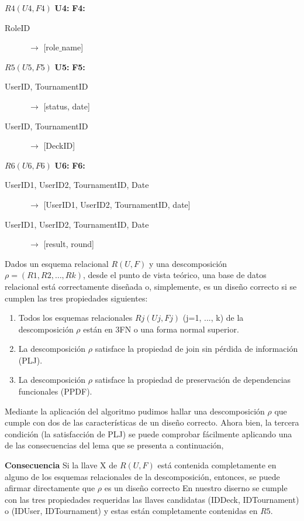 \documentclass[a4paper]{article}
\begin{document}
$R4(U4,F4)$
\textbf{U4:}
\textbf{F4:}
\begin{description}
  \item[RoleID] $\rightarrow$ [role$\_$name]
\end{description}

$R5(U5,F5)$
\textbf{U5:}
\textbf{F5:}
\begin{description}
  \item[UserID, TournamentID] $\rightarrow$ [status, date]
  \item[UserID, TournamentID] $\rightarrow$ [DeckID]
\end{description}

$R6(U6,F6)$
\textbf{U6:}
\textbf{F6:}
\begin{description}
  \item[UserID1, UserID2, TournamentID, Date] $\rightarrow$ [UserID1, UserID2, TournamentID, date]
  \item[UserID1, UserID2, TournamentID, Date] $\rightarrow$ [result, round]
\end{description}

Dados un esquema relacional $R (U, F)$ y una descomposición $\rho = (R1, R2, \ldots, Rk)$, desde el punto de vista teórico, una base de datos relacional está correctamente diseñada o, simplemente, es un diseño correcto si se cumplen las tres propiedades siguientes: 
\begin{enumerate}
  \item Todos los esquemas relacionales $Rj (Uj, Fj)$ (j=1, ..., k) de la descomposición $\rho$ están en 3FN o una forma normal superior. 
  \item La descomposición $\rho$ satisface la propiedad de join sin pérdida de información (PLJ). 
  \item La descomposición $\rho$ satisface la propiedad de preservación de dependencias funcionales (PPDF).
\end{enumerate}

Mediante la aplicación del algoritmo pudimos hallar una descomposición $\rho$ que cumple con dos de las características de un diseño correcto. Ahora bien, la tercera condición (la satisfacción de PLJ) se puede comprobar fácilmente aplicando una de las consecuencias del lema que se presenta a continuación,

\textbf{Consecuencia} Si la llave X de $R (U, F)$ está contenida completamente en alguno de los esquemas relacionales de la descomposición, entonces, se puede afirmar directamente que $\rho$ es un diseño correcto 
En nuestro diserno se cumple con las tres propiedades requeridas las llaves candidatas (IDDeck, IDTournament) o (IDUser, IDTournament) y estas están completamente contenidas en $R5$.\\ \\
\end{document}
